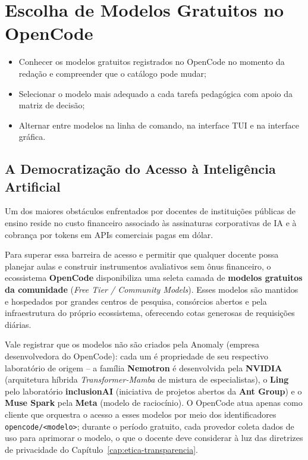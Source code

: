 \chapter{Escolha de Modelos Gratuitos no OpenCode}
\label{cap:modelos-gratuitos}

\begin{objetivos}
\begin{itemize}
  \item Conhecer os modelos gratuitos registrados no OpenCode no momento da reda{\c c}{\~a}o e compreender que o cat{\'a}logo pode mudar;
  \item Selecionar o modelo mais adequado a cada tarefa pedag{\'o}gica com apoio da matriz de decis{\~a}o;
  \item Alternar entre modelos na linha de comando, na interface TUI e na interface gr{\'a}fica.
\end{itemize}
\end{objetivos}

\section{A Democratiza{\c c}{\~a}o do Acesso {\`a} Intelig{\^e}ncia Artificial}

Um dos maiores obst{\'a}culos enfrentados por docentes de institui{\c c}{\~o}es p{\'u}blicas de ensino reside no custo financeiro associado {\`a}s assinaturas corporativas de IA e {\`a} cobran{\c c}a por tokens em APIs comerciais pagas em d{\'o}lar.

Para superar essa barreira de acesso e permitir que qualquer docente possa planejar aulas e construir instrumentos avaliativos sem {\^o}nus financeiro, o ecossistema \textbf{OpenCode} disponibiliza uma seleta camada de \textbf{modelos gratuitos da comunidade} (\emph{Free Tier / Community Models}). Esses modelos s{\~a}o mantidos e hospedados por grandes centros de pesquisa, cons{\'o}rcios abertos e pela infraestrutura do pr{\'o}prio ecossistema, oferecendo cotas generosas de requisi{\c c}{\~o}es di{\'a}rias.

Vale registrar que os modelos n{\~a}o s{\~a}o criados pela Anomaly (empresa desenvolvedora do OpenCode): cada um {\'e} propriedade de seu respectivo laborat{\'o}rio de origem -- a fam{\'i}lia \textbf{Nemotron} {\'e} desenvolvida pela \textbf{NVIDIA} (arquitetura h{\'i}brida \emph{Transformer-Mamba} de mistura de especialistas), o \textbf{Ling} pelo laborat{\'o}rio \textbf{inclusionAI} (iniciativa de projetos abertos da \textbf{Ant Group}) e o \textbf{Muse Spark} pela \textbf{Meta} (modelo de racioc{\'i}nio). O OpenCode atua apenas como cliente que orquestra o acesso a esses modelos por meio dos identificadores \texttt{opencode/<modelo>}; durante o per{\'i}odo gratuito, cada provedor coleta dados de uso para aprimorar o modelo, o que o docente deve considerar {\`a} luz das diretrizes de privacidade do Cap{\'i}tulo~\ref{cap:etica-transparencia}.

